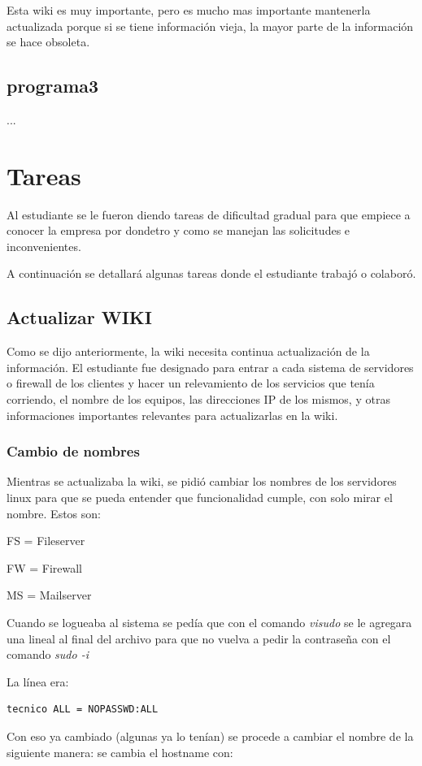 \documentclass[12pt,a4paper]{article}
\begin{document}
Esta wiki es muy importante, pero es mucho mas importante mantenerla actualizada porque si se tiene información vieja, la mayor parte de la información se hace obsoleta. 

\subsection{programa3}
...

\section{Tareas}
Al estudiante se le fueron diendo tareas de dificultad gradual para que empiece a conocer la empresa por dondetro y como se manejan las solicitudes e inconvenientes.

A continuación se detallará algunas tareas donde el estudiante trabajó o colaboró.

\subsection{Actualizar WIKI}
Como se dijo anteriormente, la wiki necesita continua actualización de la información. El estudiante fue designado para entrar a cada sistema de servidores o firewall de los clientes y hacer un relevamiento de los servicios que tenía corriendo, el nombre de los equipos, las direcciones IP de los mismos, y otras informaciones importantes relevantes para actualizarlas en la wiki. 

\subsubsection{Cambio de nombres}
Mientras se actualizaba la wiki, se pidió cambiar los nombres de los servidores linux para que se pueda entender que funcionalidad cumple, con solo mirar el nombre. Estos son:

FS = Fileserver

FW = Firewall

MS = Mailserver

Cuando se logueaba al sistema se pedía que con el comando \textit{visudo} se le agregara una lineal al final del archivo para que no vuelva a pedir la contraseña con el comando \textit{sudo -i} 

La línea era:
\begin{lstlisting}
tecnico ALL = NOPASSWD:ALL
\end{lstlisting}


Con eso ya cambiado (algunas ya lo tenían) se procede a cambiar el nombre de la siguiente manera: se cambia el hostname con:
\end{document}
